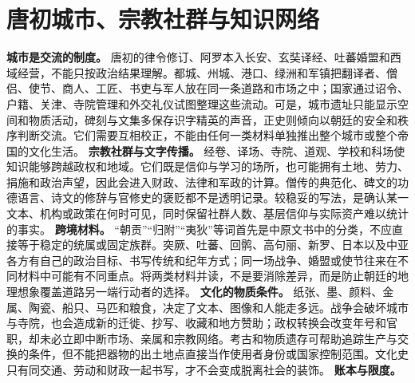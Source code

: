 \section{唐初城市、宗教社群与知识网络} \label{sec:early-tang-urban-religious-networks}  \noindent\textbf{城市是交流的制度。} 唐初的律令修订、阿罗本入长安、玄奘译经、吐蕃婚盟和西域经营，不能只按政治结果理解。都城、州城、港口、绿洲和军镇把翻译者、僧侣、使节、商人、工匠、书吏与军人放在同一条道路和市场之中；国家通过诏令、户籍、关津、寺院管理和外交礼仪试图整理这些流动。可是，城市遗址只能显示空间和物质活动，碑刻与文集多保存识字精英的声音，正史则倾向以朝廷的安全和秩序判断交流。它们需要互相校正，不能由任何一类材料单独推出整个城市或整个帝国的文化生活。  \noindent\textbf{宗教社群与文字传播。} 经卷、译场、寺院、道观、学校和科场使知识能够跨越政权和地域。它们既是信仰与学习的场所，也可能拥有土地、劳力、捐施和政治声望，因此会进入财政、法律和军政的计算。僧传的典范化、碑文的功德语言、诗文的修辞与官修史的褒贬都不是透明记录。较稳妥的写法，是确认某一文本、机构或政策在何时可见，同时保留社群人数、基层信仰与实际资产难以统计的事实。  \noindent\textbf{跨境材料。} “朝贡”“归附”“夷狄”等词首先是中原文书中的分类，不应直接等于稳定的统属或固定族群。突厥、吐蕃、回鹘、高句丽、新罗、日本以及中亚各方有自己的政治目标、书写传统和纪年方式；同一场战争、婚盟或使节往来在不同材料中可能有不同重点。将两类材料并读，不是要消除差异，而是防止朝廷的地理想象覆盖道路另一端行动者的选择。  \noindent\textbf{文化的物质条件。} 纸张、墨、颜料、金属、陶瓷、船只、马匹和粮食，决定了文本、图像和人能走多远。战争会破坏城市与寺院，也会造成新的迁徙、抄写、收藏和地方赞助；政权转换会改变年号和官职，却未必立即中断市场、亲属和宗教网络。考古和物质遗存可帮助追踪生产与交换的条件，但不能把器物的出土地点直接当作使用者身份或国家控制范围。文化史只有同交通、劳动和财政一起书写，才不会变成脱离社会的装饰。  \noindent\textbf{账本与限度。} 